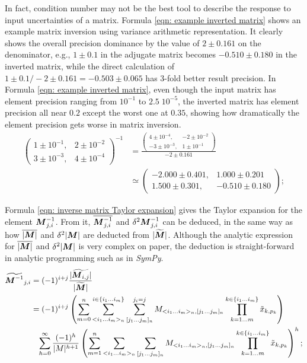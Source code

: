 \documentclass[twoside]{article}
\numberwithin{equation}{section}
\newcommand{\eqspace}{\;\;\;}
\begin{document}
In fact, condition number may not be the best tool to describe the response to input uncertainties of a matrix.
Formula \eqref{eqn: example inverted matrix} shows an example matrix inversion using variance arithmetic representation.
It clearly shows the overall precision dominance by the value of $2 \pm 0.161$ on the denominator, e.g., $1 \pm 0.1$ in the adjugate matrix becomes $-0.510 \pm 0.180$ in the inverted matrix, while the direct calculation of $1 \pm 0.1 / -2 \pm 0.161 = -0.503 \pm 0.065$ has $3$-fold better result precision.
In Formula \eqref{eqn: example inverted matrix}, even though the input matrix has element precision ranging from $10^{-1}$ to $2.5\;10^{-5}$, the inverted matrix has element precision all near $0.2$ except the worst one at $0.35$, showing how dramatically the element precision gets worse in matrix inversion.
\begin{align}
\label{eqn: example inverted matrix}
\left( \begin{matrix} 1 \pm 10^{-1}, & 2 \pm 10^{-2} \\ 3 \pm 10^{-3}, & 4 \pm 10^{-4} \end{matrix} \right)^{-1} &= 
\frac{ \left( \begin{matrix} 4 \pm 10^{-4}, & -2 \pm 10^{-2} \\ -3 \pm 10^{-3}, & 1 \pm 10^{-1} \end{matrix} \right) }{-2 \pm 0.161} \\
&\simeq \left( \begin{matrix} -2.000 \pm 0.401, & 1.000 \pm 0.201 \\ 1.500 \pm 0.301, & -0.510 \pm 0.180 \end{matrix} \right); \nonumber
\end{align}

Formula \eqref{eqn: inverse matrix Taylor expansion} gives the Taylor expansion for the element $\protect{\textrm{\boldmath $M$}}^{-1}_{j,i}$.
From it, $\overline{\protect{\textrm{\boldmath $M$}}^{-1}_{j,i}}$ and $\delta^2 \protect{\textrm{\boldmath $M$}}^{-1}_{j,i}$ can be deduced, in the same way as how  $\overline{|\protect{\textrm{\boldmath $M$}}|}$ and $\delta^2 |\protect{\textrm{\boldmath $M$}}|$ are deducted from $|\widetilde{\protect{\textrm{\boldmath $M$}}}|$.
Although the analytic expression for $\overline{|\protect{\textrm{\boldmath $M$}}|}$ and $\delta^2 |\protect{\textrm{\boldmath $M$}}|$ is very complex on paper, the deduction is straight-forward in analytic programming such as in \textit{SymPy}.
\begin{align}
\label{eqn: inverse matrix Taylor expansion}
\widetilde{\M^{-1}}_{j,i} &= (-1)^{i+j} \frac{|\widetilde{\M_{i,j}}|}{|\widetilde{\M}|} \\
	&= (-1)^{i+j} \left( \sum_{m=0}^n \sum_{<i_1 \dots i_m>_n}^{i \in \{i_1 \dots i_m\}} \sum_{[j_1 \dots j_{m}]_n}^{j_i =j} 
							M_{<i_1 \dots i_m>_n, [j_1 \dots j_{m}]_n} \prod_{k=1 \dots m}^{k \in \{i_1 \dots i_m\}} \tilde{x}_{k,p_{k}} \right) \nonumber \\
	&\eqspace \sum_{h=0}^{\infty} \frac{(-1)^h}{|M|^{h+1}}
				   \left( \sum_{m=1}^n \sum_{<i_1 \dots i_m>_n} \sum_{[j_1 \dots j_{m}]_n}
							M_{<i_1 \dots i_m>_n, [j_1 \dots j_{m}]_n} \prod_{k=1 \dots m}^{k \in \{i_1 \dots i_m\}} \tilde{x}_{k,p_{k}} \right)^h; \nonumber
\end{align}
\end{document}
